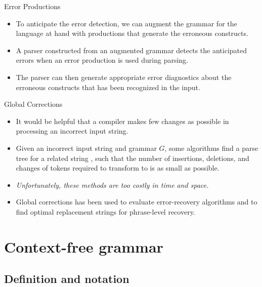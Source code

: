 \begin{bibunit}[apalike]
\begin{frame}{Error Productions}
	\begin{itemize}
	\item To anticipate the error detection, we can augment the grammar for the language at hand with productions that generate the erroneous constructs.
	\vfill
	\item A parser constructed from an augmented grammar detects the anticipated errors when an error production is used during parsing.
	\vfill
	\item The parser can then generate appropriate error diagnostics about the erroneous constructs that has been  recognized in the input.
	\end{itemize}
\end{frame}

\begin{frame}{Global Corrections}
	\begin{itemize}
	\item It would be helpful that a compiler makes few changes as possible in processing an incorrect input string.
	\vfill
	\item Given an incorrect input string  and grammar $G$, some algorithms find a parse tree for a related string , such that the number of insertions, deletions, and changes of tokens required to transform  to  is as small as possible.
	\vfill
	\item \emph{Unfortunately, these methods are too costly in time and space.}
	\vfill
	\item Global corrections has been used to evaluate error-recovery algorithms and to find optimal replacement strings for phrase-level recovery.
	\end{itemize}
\end{frame}

\section{Context-free grammar}

\tableofcontentslide[sections={1-4},sectionstyle={show/shaded},subsectionstyle={show/show/hide},subsubsectionstyle={hide/hide/hide/hide}]

\subsection{Definition and notation}


\end{bibunit}
